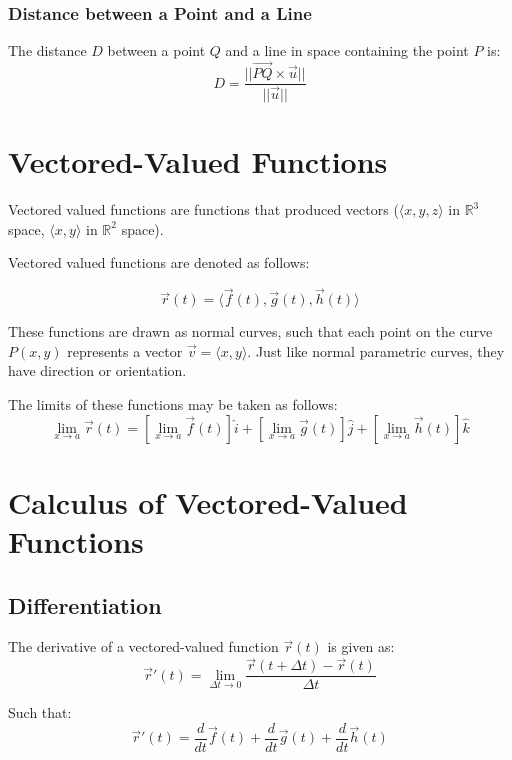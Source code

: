 \subsubsection{Distance between a Point and a Line}
The distance $D$ between a point $Q$ and a line in space containing the point
$P$ is:
\begin{equation}
  D = \frac{||\vec{PQ}\times\vec{u}||}{||\vec{u}||}
\end{equation}

\section{Vectored-Valued Functions}
Vectored valued functions are functions that produced vectors ($\langle x,y,z
\rangle$ in $\mathbb{R}^3$ space, $\langle x,y \rangle$ in $\mathbb{R}^2$ space).

Vectored valued functions are denoted as follows:

\begin{equation}
  \vec{r}(t) = \langle \vec{f}(t), \vec{g}(t), \vec{h}(t) \rangle
\end{equation}

These functions are drawn as normal curves, such that each point on the curve
$P(x,y)$ represents a vector $\vec{v} = \langle x,y \rangle$. Just like normal
parametric curves, they have direction or orientation.

The limits of these functions may be taken as follows:
\begin{equation}
  \lim_{x\to{a}} \vec{r}(t) =
    \left[\lim_{x\to{a}}\vec{f}(t)\right]\hat{i} +
    \left[\lim_{x\to{a}}\vec{g}(t)\right]\hat{j} +
    \left[\lim_{x\to{a}}\vec{h}(t)\right]\hat{k}
\end{equation}

\section{Calculus of Vectored-Valued Functions}
\subsection{Differentiation}
The derivative of a vectored-valued function $\vec{r}(t)$ is given as:
\begin{equation}
  \vec{r}'(t)=\lim_{\Delta{t}\to{0}}
    \frac{\vec{r}(t+\Delta{t})-\vec{r}(t)}{\Delta{t}}
\end{equation}

Such that:
\begin{equation}
  \vec{r}'(t) = \frac{d}{dt}\vec{f}(t) +
                \frac{d}{dt}\vec{g}(t) +
                \frac{d}{dt}\vec{h}(t)
\end{equation}

